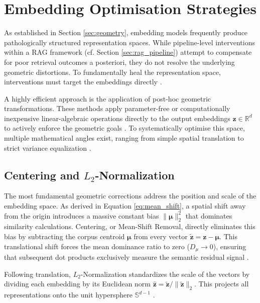 \section{Embedding Optimisation Strategies}
\label{sec:optimization_strategies}

As established in Section \ref{sec:geometry}, embedding models frequently produce pathologically structured representation spaces. While pipeline-level interventions within a \ac{RAG} framework (cf. Section \ref{sec:rag_pipeline}) attempt to compensate for poor retrieval outcomes a posteriori, they do not resolve the underlying geometric distortions. To fundamentally heal the representation space, interventions must target the embeddings directly \cite{ethayarajh-2019-contextual, GaoHTQWL19, Li_2020_Sentence}.

A highly efficient approach is the application of post-hoc geometric transformations. These methods apply parameter-free or computationally inexpensive linear-algebraic operations directly to the output embeddings $\mathbf{z} \in \mathbb{R}^d$ to actively enforce the geometric goals \cite{apidianaki_2023_word}. To systematically optimise this space, multiple mathematical angles exist, ranging from simple spatial translation to strict variance equalization \cite{mu2018allbutthetop, su2021whitening}.

\subsection{Centering and $L_2$-Normalization}
\label{sec:theory_centering_norm}

The most fundamental geometric corrections address the position and scale of the embedding space. As derived in Equation \ref{eq:mean_shift}, a spatial shift away from the origin introduces a massive constant bias $\|\boldsymbol{\mu}\|_2^2$ that dominates similarity calculations. Centering, or Mean-Shift Removal, directly eliminates this bias by subtracting the corpus centroid $\boldsymbol{\mu}$ from every vector $\tilde{\mathbf{z}} = \mathbf{z} - \boldsymbol{\mu}$. This translational shift forces the mean dominance ratio to zero ($D_\mu \to 0$), ensuring that subsequent dot products exclusively measure the semantic residual signal \cite{mu2018allbutthetop,ethayarajh-2019-contextual}.

Following translation, $L_2$-Normalization standardizes the scale of the vectors by dividing each embedding by its Euclidean norm $\hat{\mathbf{z}} = \tilde{\mathbf{z}} / \|\tilde{\mathbf{z}}\|_2$. This projects all representations onto the unit hypersphere $\mathbb{S}^{d-1}$ \cite{wang-isola-2020-contrastive}. %

